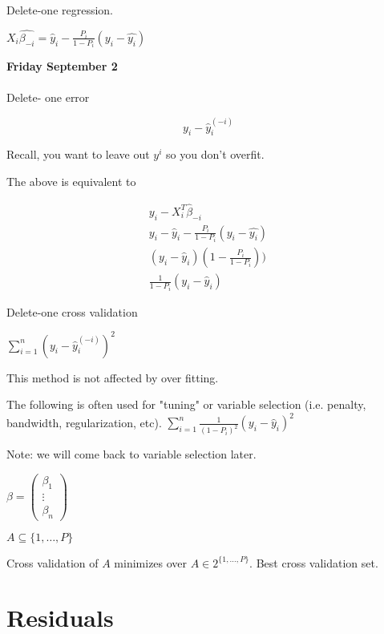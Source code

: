 \documentclass[11pt,fleqn]{book} %
\begin{document}
Delete-one regression. 

$X_i\hat{\beta_{-i}} = \hat{y}_i - \frac{P_i}{1 - P_i} (y_i - \hat{y_i})$

\textbf{Friday September 2}\\
\\

Delete- one error

$$y_i - \hat{y}_i^{(-i)}$$

\begin{remark}
	Recall, you want to leave out $y^{i}$ so you don't overfit. 
\end{remark}


The above is equivalent to 

\begin{align*}
	y_i - X_i^T \hat{\beta}_{-i}\\
	y_i - \hat{y}_i - \frac{P_i}{1 - P_i} (y_i - \hat{y_i})\\
	(y_i - \hat{y}_i) (1 - \frac{P_i}{1 - P_i}))\\
	\frac{1}{1 - P_i} (y_i - \hat{y}_i)
\end{align*}


Delete-one cross validation 

$\displaystyle \sum^n_{i=1} (y_i - \hat{y}_i^{(-i)})^2$

This method is not affected by over fitting. 

The following is often used for "tuning" or variable selection (i.e. penalty, bandwidth, regularization, etc).
$ \displaystyle \sum^n_{i=1} \frac{1}{(1 - P_i)^2}(y_i - \hat{y}_i)^2$

Note: we will come back to variable selection later. 

$\beta = \begin{pmatrix} \beta_1  \\  
\vdots \\
\beta_n
 \end{pmatrix}$

$ A \subseteq \{1, \dots, P \}$

Cross validation of $A$ minimizes over $A \in 2^{\{1, \dots, P \}}$. Best cross validation set. 




\section{Residuals}
\end{document}
